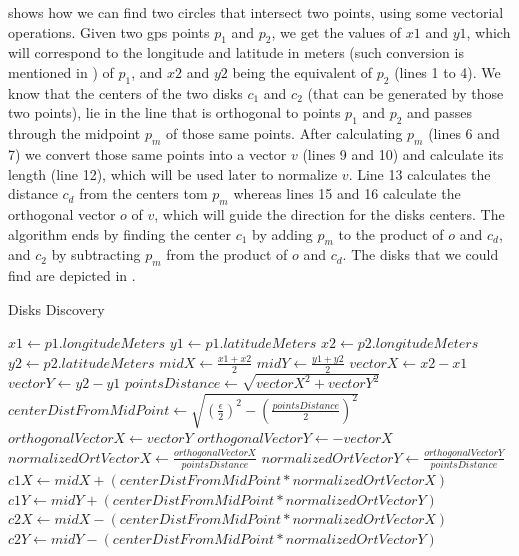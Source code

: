  shows how we can find two circles that intersect two points, using some vectorial operations. Given
two \ac{gps} points $p_1$ and $p_2$, we get the values of $x1$ and $y1$, which will correspond to the longitude and
latitude in meters (such conversion is mentioned in ) of $p_1$, and $x2$ and $y2$ being the
equivalent of $p_2$ (lines 1 to 4). We know that the centers of the two disks $c_1$ and $c_2$ (that can be generated by
those two points), lie in the line that is orthogonal to points $p_1$ and $p_2$ and passes through the midpoint $p_m$ of
those same points. After calculating $p_m$ (lines 6 and 7) we convert those same points into a vector $v$ (lines 9 and
10) and calculate its length (line 12), which will be used later to normalize $v$. Line 13 calculates the distance $c_d$
from the centers tom $p_m$ whereas lines 15 and 16 calculate the orthogonal vector $o$ of $v$, which will guide the
direction for the disks centers. The algorithm ends by finding the center $c_1$ by adding $p_m$ to the product of $o$
and $c_d$, and $c_2$ by subtracting $p_m$ from the product of $o$ and $c_d$. The disks that we could find are depicted
in .

\begin{algorithm}[h!]
\caption{Disks Discovery}
\label{alg:disks}
\begin{algorithmic}[1]
    \State $x1 \gets p1.longitudeMeters$
    \State $y1 \gets p1.latitudeMeters$
    \State $x2 \gets p2.longitudeMeters$
    \State $y2 \gets p2.latitudeMeters$
    \State
    \State $midX \gets \frac{x1 + x2}{2}$
    \State $midY \gets \frac{y1 + y2}{2}$
    \State
    \State $vectorX \gets x2 - x1$
    \State $vectorY \gets y2 - y1$
    \State
    \State $pointsDistance \gets \sqrt{vectorX^2 + vectorY^2}$
    \State $centerDistFromMidPoint \gets \sqrt{(\frac{\epsilon}{2})^2 - (\frac{pointsDistance}{2})^2}$
    \State
    \State $orthogonalVectorX \gets vectorY$
    \State $orthogonalVectorY \gets -vectorX$
    \State
    \State $normalizedOrtVectorX \gets \frac{orthogonalVectorX}{pointsDistance}$
    \State $normalizedOrtVectorY \gets \frac{orthogonalVectorY}{pointsDistance}$
    \State
    \State $c1X \gets midX + (centerDistFromMidPoint * normalizedOrtVectorX)$
    \State $c1Y \gets midY + (centerDistFromMidPoint * normalizedOrtVectorY)$
    \State
    \State $c2X \gets midX - (centerDistFromMidPoint * normalizedOrtVectorX)$
    \State $c2Y \gets midY - (centerDistFromMidPoint * normalizedOrtVectorY)$
\end{algorithmic}
\end{algorithm}

